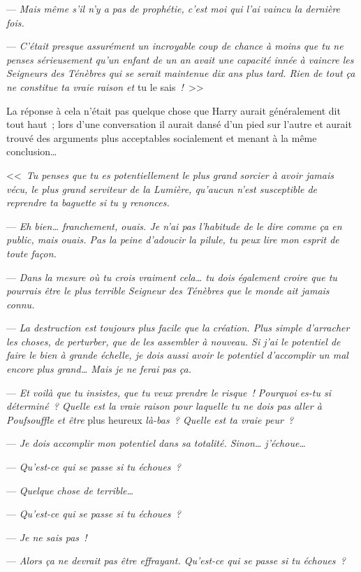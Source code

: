 --- \emph{Mais même s'il n'y a pas de prophétie, c'est moi qui l'ai vaincu la dernière fois.}

--- \emph{C'était presque assurément un incroyable coup de chance à moins que tu ne penses sérieusement qu'un enfant de un an avait une capacité innée à vaincre les Seigneurs des Ténèbres qui se serait maintenue dix ans plus tard. Rien de tout ça ne constitue ta vraie raison et} tu le sais\emph{~!}~>>

La réponse à cela n'était pas quelque chose que Harry aurait généralement dit tout haut~; lors d'une conversation il aurait dansé d'un pied sur l'autre et aurait trouvé des arguments plus acceptables socialement et menant à la même conclusion…

<<~\emph{Tu penses que tu es potentiellement le plus grand sorcier à avoir jamais vécu, le plus grand serviteur de la Lumière, qu'aucun n'est susceptible de reprendre ta baguette si tu y renonces.}

--- \emph{Eh bien… franchement, ouais. Je n'ai pas l'habitude de le dire comme ça en public, mais ouais. Pas la peine d'adoucir la pilule, tu peux lire mon esprit de toute façon.}

--- \emph{Dans la mesure où tu crois vraiment cela… tu dois également croire que tu pourrais être le plus terrible Seigneur des Ténèbres que le monde ait jamais connu.}

--- \emph{La destruction est toujours plus facile que la création. Plus simple d'arracher les choses, de perturber, que de les assembler à nouveau. Si j'ai le potentiel de faire le bien à grande échelle, je dois aussi avoir le potentiel d'accomplir un mal encore plus grand… Mais je ne ferai pas ça.}

--- \emph{Et voilà que tu insistes, que tu veux prendre le risque~! Pourquoi es-tu si déterminé~? Quelle est la vraie raison pour laquelle tu ne dois pas aller à Poufsouffle et être} plus heureux \emph{là-bas~? Quelle est ta vraie peur~?}

--- \emph{Je dois accomplir mon potentiel dans sa totalité. Sinon… j'échoue…}

--- \emph{Qu'est-ce qui se passe si tu échoues~?}

--- \emph{Quelque chose de terrible…}

--- \emph{Qu'est-ce qui se passe si tu échoues~?}

--- \emph{Je ne sais pas~!}

--- \emph{Alors ça ne devrait pas être effrayant. Qu'est-ce qui se passe si tu échoues~?}

